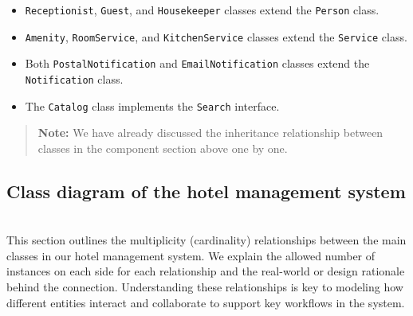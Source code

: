 \begin{itemize}
\item
\protect{}\label{LNjSNXtmMfDwCFEdKnndw}
\texttt{Receptionist}, \texttt{Guest}, and \texttt{Housekeeper} classes extend the \texttt{Person} class.
\item
\protect{}\label{bBi44hMfWmJDhnc6lsiub}
\texttt{Amenity}, \texttt{RoomService}, and \texttt{KitchenService} classes extend the \texttt{Service} class.
\item
\protect{}\label{fUTL88BzgvW8G2PAi2rQG}
Both \texttt{PostalNotification} and \texttt{EmailNotification} classes extend the \texttt{Notification} class.
\item
\protect{}\label{ZPApGdQQpCwjaeYGTqkNW}
The \texttt{Catalog} class implements the \texttt{Search} interface.
\end{itemize}
\begin{quote}
\textbf{Note:} We have already discussed the inheritance relationship between classes in the component section above one by one.
\end{quote}
\subsection{Class diagram of the hotel management system}\label{W0nuQJv6sS971g9ujUKFo}
\\
This section outlines the multiplicity (cardinality) relationships between the main classes in our hotel management system. We explain the allowed number of instances on each side for each relationship and the real-world or design rationale behind the connection. Understanding these relationships is key to modeling how different entities interact and collaborate to support key workflows in the system.

